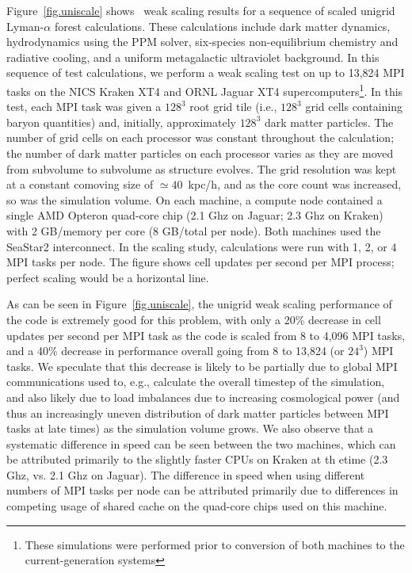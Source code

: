Figure~\ref{fig.uniscale} shows \enzo\ weak scaling results for a
sequence of scaled unigrid Lyman-$\alpha$ forest calculations. These
calculations include dark matter dynamics, hydrodynamics using the
PPM solver, six-species non-equilibrium chemistry and
radiative cooling, and a uniform metagalactic ultraviolet background.
In this sequence of test calculations, we perform a weak scaling test
on up to 13,824 MPI tasks on the NICS Kraken XT4 and ORNL Jaguar XT4
supercomputers\footnote{These simulations were performed prior to
conversion of both machines to the current-generation systems}.  In
this test, each MPI task was given a $128^3$ root grid tile (i.e.,
$128^3$ grid cells containing baryon quantities) and, initially,
approximately $128^3$ dark matter particles.  The number of grid cells
on each processor 
was constant throughout the calculation; the number of dark matter
particles on each processor varies as they are moved from subvolume to subvolume as
structure evolves.  The grid resolution was kept at a constant
comoving size of $\simeq 40$~kpc/h, and as the core count was
increased, so was the simulation volume.  On each machine, a compute
node contained a single AMD Opteron quad-core chip (2.1 Ghz on Jaguar;
2.3 Ghz on Kraken) with 2 GB/memory per core (8 GB/total per node).
Both machines used the SeaStar2 interconnect.  In the scaling study,
calculations were run with 1, 2, or 4 MPI tasks per node.  The figure
shows cell updates per second per MPI process; perfect scaling would
be a horizontal line.

As can be seen in Figure~\ref{fig.uniscale}, the unigrid weak scaling
performance of the code is extremely good for this problem, with only
a 20\% decrease in cell updates per second per MPI task as the code is scaled from
8 to 4,096 MPI tasks, and a 40\% decrease in performance overall going
from 8 to 13,824 (or $24^3$) MPI tasks.  We speculate that this
decrease is likely to be partially due to global MPI communications
used to, e.g., calculate the overall timestep of the simulation, and
also likely due to load imbalances due to increasing cosmological
power (and thus an increasingly uneven distribution of dark matter
particles between MPI tasks at late times) as the simulation volume
grows.  We also observe that a systematic difference in speed can be
seen between the two machines, which can be attributed primarily to
the slightly faster CPUs on Kraken at th etime (2.3 Ghz, vs. 2.1 Ghz
on Jaguar).  The difference in speed when using different numbers of
MPI tasks per node can be attributed primarily due to differences in
competing usage of shared cache on the quad-core chips used on this
machine.

